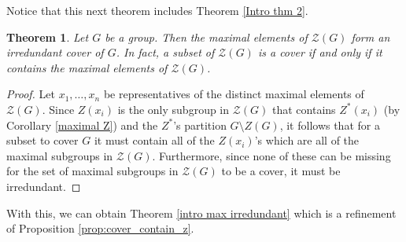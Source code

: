 \documentclass[12pt]{amsart}
\newtheorem{theorem}{Theorem}[section]
\begin{document}
{%

Notice that this next theorem includes Theorem \ref{Intro thm 2}.

\begin{theorem} \label{max centers irredundant}
Let $G$ be a group.  Then the maximal elements of $\mathcal {Z} (G)$ form an irredundant cover of $G$.  In fact, a subset of $\mathcal {Z} (G)$ is a cover if and only if it contains the maximal elements of $\mathcal {Z} (G)$.
\end{theorem}

\begin{proof}
Let $x_1, \dots, x_n$ be representatives of the distinct maximal elements of $\mathcal {Z} (G)$.  Since $Z(x_i)$ is the only subgroup in $\mathcal{Z} (G)$ that contains $Z^* (x_i)$ (by Corollary \ref{maximal Z}) and the $Z^*$'s partition $G \setminus Z(G)$, it follows that for a subset to cover $G$ it must contain all of the $Z(x_i)$'s which are all of the maximal subgroups in $\mathcal {Z} (G)$.  Furthermore, since none of these can be missing for the set of maximal subgroups in $\mathcal {Z} (G)$ to be a cover, it must be irredundant.  
\end{proof}

With this, we can obtain Theorem \ref{intro max irredundant} which is  a refinement of Proposition \ref{prop:cover_contain_z}.


}
\end{document}
